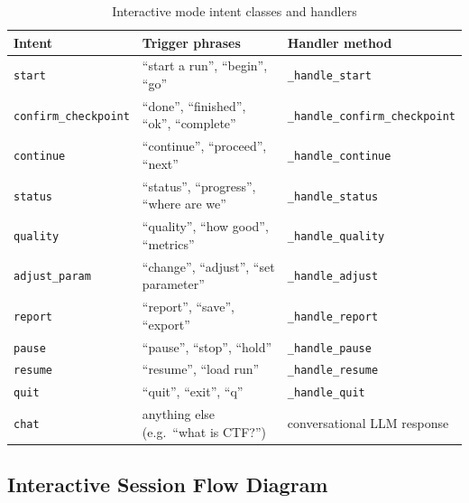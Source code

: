 \documentclass[12pt, a4paper]{article}
\begin{document}
\begin{table}[H]
\centering
\caption{Interactive mode intent classes and handlers}
\label{tab:intents}
\renewcommand{\arraystretch}{1.3}
\begin{tabular}{l p{5.4cm} l}
\toprule
\textbf{Intent} & \textbf{Trigger phrases} & \textbf{Handler method} \\
\midrule
\texttt{start}
  & ``start a run'', ``begin'', ``go''
  & \texttt{\_handle\_start} \\
\texttt{confirm\_checkpoint}
  & ``done'', ``finished'', ``ok'', ``complete''
  & \texttt{\_handle\_confirm\_checkpoint} \\
\texttt{continue}
  & ``continue'', ``proceed'', ``next''
  & \texttt{\_handle\_continue} \\
\texttt{status}
  & ``status'', ``progress'', ``where are we''
  & \texttt{\_handle\_status} \\
\texttt{quality}
  & ``quality'', ``how good'', ``metrics''
  & \texttt{\_handle\_quality} \\
\texttt{adjust\_param}
  & ``change'', ``adjust'', ``set parameter''
  & \texttt{\_handle\_adjust} \\
\texttt{report}
  & ``report'', ``save'', ``export''
  & \texttt{\_handle\_report} \\
\texttt{pause}
  & ``pause'', ``stop'', ``hold''
  & \texttt{\_handle\_pause} \\
\texttt{resume}
  & ``resume'', ``load run''
  & \texttt{\_handle\_resume} \\
\texttt{quit}
  & ``quit'', ``exit'', ``q''
  & \texttt{\_handle\_quit} \\
\texttt{chat}
  & anything else (e.g.\ ``what is CTF?'')
  & conversational LLM response \\
\bottomrule
\end{tabular}
\end{table}

\subsection{Interactive Session Flow Diagram}
\end{document}
